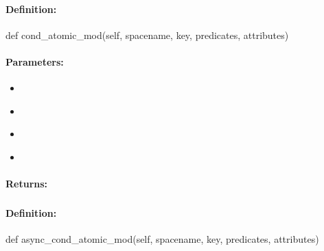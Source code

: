 \paragraph{Definition:}
\begin{pythoncode}
def cond_atomic_mod(self, spacename, key, predicates, attributes)
\end{pythoncode}

\paragraph{Parameters:}
\begin{itemize}[noitemsep]
\item {}\\

\item {}\\

\item {}\\

\item {}\\

\end{itemize}

\paragraph{Returns:}


\pagebreak
\subsubsection{}
\label{api:python:async_cond_atomic_mod}


\paragraph{Definition:}
\begin{pythoncode}
def async_cond_atomic_mod(self, spacename, key, predicates, attributes)
\end{pythoncode}

